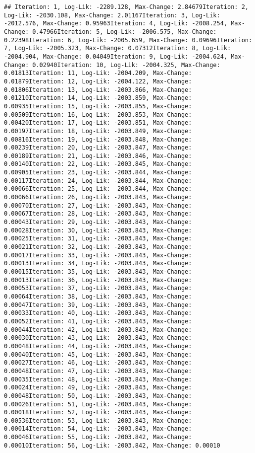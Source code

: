 \documentclass[
]{article}
\begin{document}
\begin{verbatim}
## Iteration: 1, Log-Lik: -2289.128, Max-Change: 2.84679Iteration: 2, Log-Lik: -2030.108, Max-Change: 2.01167Iteration: 3, Log-Lik: -2012.576, Max-Change: 0.95963Iteration: 4, Log-Lik: -2008.254, Max-Change: 0.47966Iteration: 5, Log-Lik: -2006.575, Max-Change: 0.22398Iteration: 6, Log-Lik: -2005.659, Max-Change: 0.09696Iteration: 7, Log-Lik: -2005.323, Max-Change: 0.07312Iteration: 8, Log-Lik: -2004.904, Max-Change: 0.04049Iteration: 9, Log-Lik: -2004.624, Max-Change: 0.02940Iteration: 10, Log-Lik: -2004.325, Max-Change: 0.01813Iteration: 11, Log-Lik: -2004.209, Max-Change: 0.01879Iteration: 12, Log-Lik: -2004.122, Max-Change: 0.01806Iteration: 13, Log-Lik: -2003.866, Max-Change: 0.01210Iteration: 14, Log-Lik: -2003.859, Max-Change: 0.00935Iteration: 15, Log-Lik: -2003.855, Max-Change: 0.00509Iteration: 16, Log-Lik: -2003.853, Max-Change: 0.00420Iteration: 17, Log-Lik: -2003.851, Max-Change: 0.00197Iteration: 18, Log-Lik: -2003.849, Max-Change: 0.00816Iteration: 19, Log-Lik: -2003.848, Max-Change: 0.00239Iteration: 20, Log-Lik: -2003.847, Max-Change: 0.00189Iteration: 21, Log-Lik: -2003.846, Max-Change: 0.00140Iteration: 22, Log-Lik: -2003.845, Max-Change: 0.00905Iteration: 23, Log-Lik: -2003.844, Max-Change: 0.00117Iteration: 24, Log-Lik: -2003.844, Max-Change: 0.00066Iteration: 25, Log-Lik: -2003.844, Max-Change: 0.00066Iteration: 26, Log-Lik: -2003.843, Max-Change: 0.00070Iteration: 27, Log-Lik: -2003.843, Max-Change: 0.00067Iteration: 28, Log-Lik: -2003.843, Max-Change: 0.00043Iteration: 29, Log-Lik: -2003.843, Max-Change: 0.00028Iteration: 30, Log-Lik: -2003.843, Max-Change: 0.00025Iteration: 31, Log-Lik: -2003.843, Max-Change: 0.00021Iteration: 32, Log-Lik: -2003.843, Max-Change: 0.00017Iteration: 33, Log-Lik: -2003.843, Max-Change: 0.00013Iteration: 34, Log-Lik: -2003.843, Max-Change: 0.00015Iteration: 35, Log-Lik: -2003.843, Max-Change: 0.00013Iteration: 36, Log-Lik: -2003.843, Max-Change: 0.00053Iteration: 37, Log-Lik: -2003.843, Max-Change: 0.00064Iteration: 38, Log-Lik: -2003.843, Max-Change: 0.00047Iteration: 39, Log-Lik: -2003.843, Max-Change: 0.00033Iteration: 40, Log-Lik: -2003.843, Max-Change: 0.00052Iteration: 41, Log-Lik: -2003.843, Max-Change: 0.00044Iteration: 42, Log-Lik: -2003.843, Max-Change: 0.00030Iteration: 43, Log-Lik: -2003.843, Max-Change: 0.00048Iteration: 44, Log-Lik: -2003.843, Max-Change: 0.00040Iteration: 45, Log-Lik: -2003.843, Max-Change: 0.00027Iteration: 46, Log-Lik: -2003.843, Max-Change: 0.00048Iteration: 47, Log-Lik: -2003.843, Max-Change: 0.00035Iteration: 48, Log-Lik: -2003.843, Max-Change: 0.00024Iteration: 49, Log-Lik: -2003.843, Max-Change: 0.00048Iteration: 50, Log-Lik: -2003.843, Max-Change: 0.00026Iteration: 51, Log-Lik: -2003.843, Max-Change: 0.00018Iteration: 52, Log-Lik: -2003.843, Max-Change: 0.00536Iteration: 53, Log-Lik: -2003.843, Max-Change: 0.00014Iteration: 54, Log-Lik: -2003.843, Max-Change: 0.00046Iteration: 55, Log-Lik: -2003.842, Max-Change: 0.00010Iteration: 56, Log-Lik: -2003.842, Max-Change: 0.00010
\end{verbatim}
\end{document}
